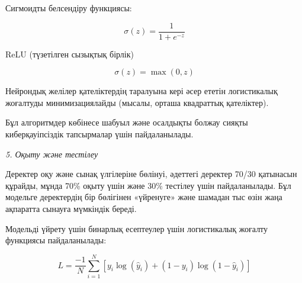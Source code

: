 \begin{multicols}{2}
Сигмоидты белсендіру функциясы:

\begin{equation}
\sigma(z) = \frac{1}{1 + e^{- z}}
\end{equation}

ReLU (түзетілген сызықтық бірлік)

\begin{equation}
\sigma(z) = \max(0,z)
\end{equation}

Нейрондық желілер қателіктердің таралуына кері әсер ететін логистикалық
жоғалтуды минимизациялайды (мысалы, орташа квадраттық қателіктер).

Бұл алгоритмдер көбінесе шабуыл және осалдықты болжау сияқты
киберқауіпсіздік тапсырмалар үшін пайдаланылады.

\emph{5. Оқыту және тестілеу}

Деректер оқу және сынақ үлгілеріне бөлінуі, әдеттегі деректер 70/30
қатынасын құрайды, мұнда 70\% оқыту үшін және 30\% тестілеу үшін
пайдаланылады. Бұл модельге деректердің бір бөлігінен «үйренуге» және
шамадан тыс өзін жаңа ақпаратта сынауға мүмкіндік береді.

Модельді үйрету үшін бинарлық есептеулер үшін логистикалық жоғалту
функциясы пайдаланылады:
\end{multicols}

\[L = \frac{- 1}{N}\sum_{i = 1}^{N}\left\lbrack y_{i}\log\left( {\hat{y}}_{i} \right) + (1 - y_{i})\log(1 - {\hat{y}}_{i}) \right\rbrack\]


